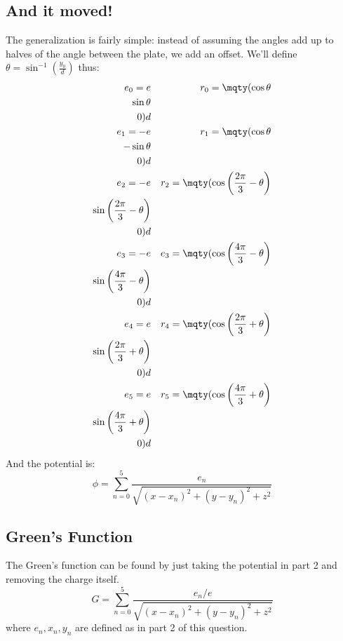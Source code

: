 \subsection{And it moved!}
The generalization is fairly simple: instead of assuming the angles add up to halves of the angle between the plate, we add an offset. We'll define $\theta=\sin^{-1}\left(\frac{y_0}{d}\right)$ thus:
\begin{align}
	e_0=e && r_0=\mqty(\cos\theta\\\sin\theta\\0)d\\
	e_1=-e && r_1=\mqty(\cos\theta\\-\sin\theta\\0)d\\
	e_2=-e && r_2=\mqty(\cos\left(\frac{2\pi}{3}-\theta\right)\\\sin\left(\frac{2\pi}{3}-\theta\right)\\0)d\\
	e_3=-e && e_3=\mqty(\cos\left(\frac{4\pi}{3}-\theta\right)\\\sin\left(\frac{4\pi}{3}-\theta\right)\\0)d\\
	e_4=e && r_4=\mqty(\cos\left(\frac{2\pi}{3}+\theta\right)\\\sin\left(\frac{2\pi}{3}+\theta\right)\\0)d\\
	e_5=e && r_5=\mqty(\cos\left(\frac{4\pi}{3}+\theta\right)\\\sin\left(\frac{4\pi}{3}+\theta\right)\\0)d\\
\end{align}
And the potential is:
\begin{equation}
  \phi=\sum\limits_{n=0}^5\frac{e_n}{\sqrt{(x-x_n)^2+(y-y_n)^2+z^2}}
\end{equation}
\subsection{Green's Function}
The Green's function can be found by just taking the potential in part 2 and removing the charge itself.
\begin{equation}
	G = \sum\limits_{n=0}^5\frac{e_n/e}{\sqrt{(x-x_n)^2+(y-y_n)^2+z^2}}
\end{equation}
where \(e_n,x_n,y_n\) are defined as in part 2 of this question.